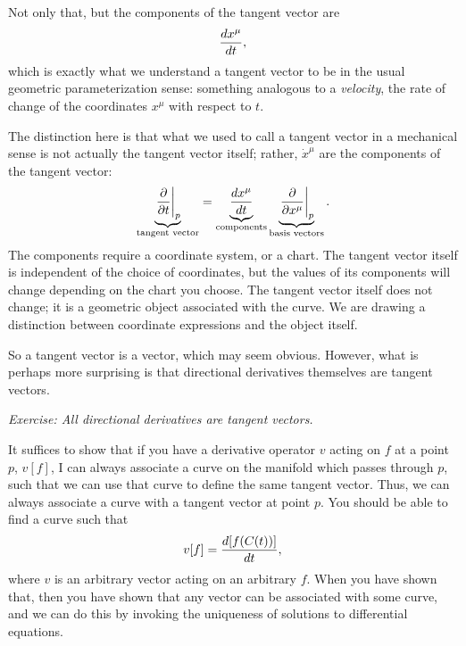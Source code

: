 		Not only that, but the components of the tangent vector are
		\[
			\dv{x^\mu}{t},
		\]
		which is exactly what we understand a tangent vector to be in the usual
		geometric parameterization sense: something analogous to a \textit{velocity},
		the rate of change of the coordinates $x^\mu$ with respect to $t$.

		The distinction here is that what we used to call a tangent vector in a
		mechanical sense is not actually the tangent vector itself; rather,
		$\dot{x}^\mu$ are the components of the tangent vector:
		\[
			\underbrace{\eval{\pdv{}{t}}_p}_{\text{tangent vector}}
			=
			\underbrace{\dv{x^\mu}{t}}_{\text{components}}
			\underbrace{
				\eval{
					\pdv{}{x^\mu}
				}_p
			}_{\text{basis vectors}}.
		\]
		The components require a coordinate system, or a chart. The tangent vector
		itself is independent of the choice of coordinates, but the values of its
		components will change depending on the chart you choose. The tangent vector
		itself does not change; it is a geometric object associated with the curve.
		We are drawing a distinction between coordinate expressions and the object itself.

		So a tangent vector is a vector, which may seem obvious. However, what is
		perhaps more surprising is that directional derivatives themselves are
		tangent vectors.

		\noindent\textit{Exercise: All directional derivatives are tangent vectors.}

		It suffices to show that if you have a derivative operator $v$ acting on
		$f$ at a point $p$, $v[f]$, I can always associate a curve on the manifold
		which passes through $p$, such that we can use that curve to define the same
		tangent vector. Thus, we can always associate a curve with a tangent vector
		at point $p$.
		You should be able to find a curve such that
		\[
			v[f] = \dv{[f(C(t))]}{t},
		\]
		where $v$ is an arbitrary vector acting on an arbitrary $f$. When you have
		shown that, then you have shown that any vector can be associated with some
		curve, and we can do this by invoking the uniqueness of solutions to
		differential equations.

